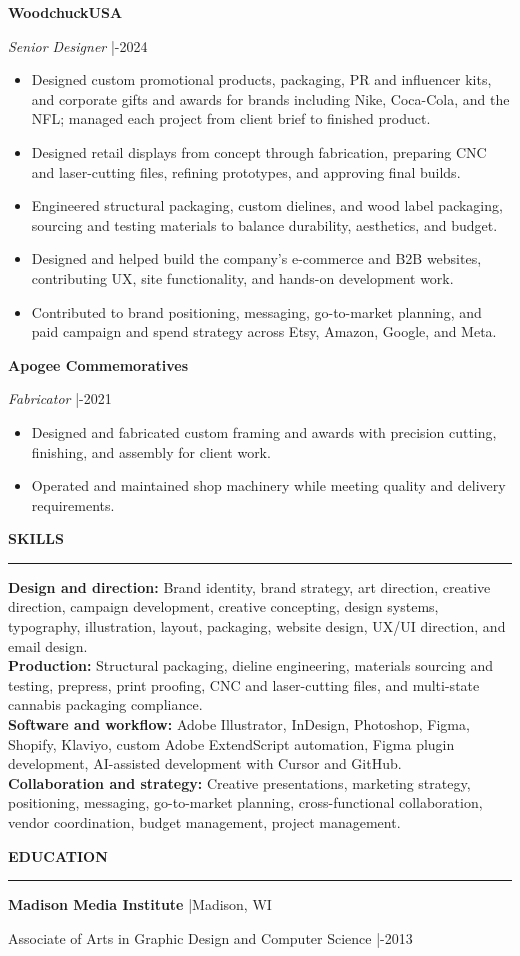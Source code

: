 \documentclass[10pt,letterpaper]{article}
\newcommand{\resumesection}[1]{%
  \vspace{4.5pt}%
  {\large\bfseries #1}\par
  \vspace{1pt}\hrule\vspace{2.5pt}%
}
\newcommand{\role}[3]{%
  {\bfseries #1}\par
  {\itshape #2} \enspace|\enspace #3\par
}
\begin{document}
\vspace{3pt}
\role{WoodchuckUSA}{Senior Designer}{2021-2024}
\begin{itemize}
  \item Designed custom promotional products, packaging, PR and influencer kits, and
    corporate gifts and awards for brands including Nike, Coca-Cola, and the NFL;
    managed each project from client brief to finished product.
  \item Designed retail displays from concept through fabrication, preparing CNC and
    laser-cutting files, refining prototypes, and approving final builds.
  \item Engineered structural packaging, custom dielines, and wood label packaging,
    sourcing and testing materials to balance durability, aesthetics, and budget.
  \item Designed and helped build the company's e-commerce and B2B websites,
    contributing UX, site functionality, and hands-on development work.
  \item Contributed to brand positioning, messaging, go-to-market planning, and paid
    campaign and spend strategy across Etsy, Amazon, Google, and Meta.
\end{itemize}

\vspace{2pt}
\role{Apogee Commemoratives}{Fabricator}{2017-2021}
\begin{itemize}
  \item Designed and fabricated custom framing and awards with precision cutting,
    finishing, and assembly for client work.
  \item Operated and maintained shop machinery while meeting quality and delivery
    requirements.
\end{itemize}

\resumesection{SKILLS}
\textbf{Design and direction:} Brand identity, brand strategy, art direction, creative
direction, campaign development, creative concepting, design systems, typography,
illustration, layout, packaging, website design, UX/UI direction, and email design.\\[1.5pt]
\textbf{Production:} Structural packaging, dieline engineering, materials sourcing and
testing, prepress, print proofing, CNC and laser-cutting files, and multi-state cannabis
packaging compliance.\\[1.5pt]
\textbf{Software and workflow:} Adobe Illustrator, InDesign, Photoshop, Figma, Shopify,
Klaviyo, custom Adobe ExtendScript automation, Figma plugin development, AI-assisted
development with Cursor and GitHub.\\[1.5pt]
\textbf{Collaboration and strategy:} Creative presentations, marketing strategy,
positioning, messaging, go-to-market planning, cross-functional collaboration, vendor
coordination, budget management, project management.

\resumesection{EDUCATION}
\textbf{Madison Media Institute} \enspace|\enspace Madison, WI\par
Associate of Arts in Graphic Design and Computer Science \enspace|-2013
\end{document}
